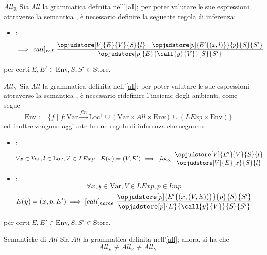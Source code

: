 \documentclass[a4paper, 12pt]{report}
\begin{document}
    \begin{framedprop}[label={all r}]{$All_\mathrm{R}$}
        Sia $All$ la grammatica definita nell'\cref{all}; per poter valutare le sue espressioni attraverso la semantica , è necessario definire la seguente regola di inferenza: 

        \begin{itemize}
            \item {}:  $$\implies [call]_{ref} \ \dfrac{\opjudstore[V]{E}{V}{S}{l} \quad \opjudstore[p]{E'\{(x,l)\}}{p}{S}{S'}}{\opjudstore[p]{E}{\call{y}{V}}{S}{S'}}$$
        \end{itemize}

        per certi $E,E' \in \mathrm{Env}, S,S' \in \mathrm{Store}$.
    \end{framedprop}

    \begin{framedprop}[label={all n}]{$All_\mathrm{N}$}
        Sia $All$ la grammatica definita nell'\cref{all}; per poter valutare le sue espressioni attraverso la semantica , è necessario ridefinire l'insieme degli ambienti, come segue $$\mathrm{Env} := \{f \mid f : \mathrm{Var} \xrightarrow{fin} \mathrm{Loc}^+ \cup (\mathrm{Var} \times All \times \mathrm{Env}) \cup (LExp \times \mathrm{Env})\}$$ ed inoltre vengono aggiunte le due regole di inferenza che seguono:

        \begin{itemize}
            \item {}: $$\forall x \in \mathrm{Var}, l \in \mathrm{Loc}, V \in LExp \quad E(x) = (V, E') \implies [loc_3] \ \dfrac{\opjudstore[V]{E'}{V}{S}{l}}{\opjudstore[V]{E}{x}{S}{l}}$$
            \item {}: $$\forall x,y \in \mathrm{Var}, V \in LExp, p \in Imp$$ $$E(y) = (x, p, E') \implies [call]_{name} \ \dfrac{\opjudstore[p]{E'\{(x,(V,E))\}}{p}{S}{S'}}{\opjudstore[p]{E}{\call{y}{V}}{S}{S'}}$$
        \end{itemize}

        per certi $E, E' \in \mathrm{Env}, S, S' \in \mathrm{Store}$.
    \end{framedprop}

    \begin{framedlem}{Semantiche di $All$}
        Sia $All$ la grammatica definita nell'\cref{all}; allora, si ha che $$All_\mathrm{V} \not\equiv All_\mathrm{R} \not\equiv All_\mathrm{N}$$
    \end{framedlem}
    
\end{document}
